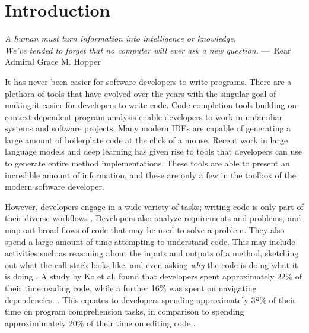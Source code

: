 
\newcommand{\numparticipants}{55}
\newcommand{\toolname}{Tool TBD}
\newcommand{\userstudynum}{75}
\newcommand{\fasterpct}{64}
\newcommand{\usefulpct}{70}

\chapter{Introduction}
\label{ch:Introduction}

\begin{epigraph}
    \emph{
       A human must turn information into intelligence or knowledge. \\
       We've tended to forget that no computer will ever ask a new question.
     } ---~Rear Admiral Grace M. Hopper
\end{epigraph}

\noindent It has never been easier for software developers to write programs.
There are a plethora of tools that have evolved over the years with the singular
goal of making it easier for developers to write code.
Code-completion tools building on context-dependent program analysis 
\cite{reps-1983-context} enable developers to work in unfamiliar systems and
software projects.
Many modern \acp{IDE} are capable of generating
a large amount of boilerplate code at the click of a mouse.
Recent work in large language models and deep learning \cite{chen-2021-copilot}
has given rise to tools that developers can use to generate entire method 
implementations.
These tools are able to present an incredible amount of information, and these 
are only a few in the toolbox of the modern software developer.

\par However, developers engage in a wide variety of tasks;
writing code is only part of their diverse workflows 
\cite{meyer-2017-work-life}.
Developers also analyze requirements and problems, and map out broad flows of
code that may be used to solve a problem.
They also spend a large amount of time attempting to understand code.
This may include activities such as reasoning about the inputs and outputs of
a method, sketching out what the call stack looks like, and even asking 
\emph{why} the code is doing what it is doing \cite{latoza-2006-mental-models}.
A study by Ko et al. found that developers spent approximately 22\% of their
time reading code, while a further 16\% was spent on navigating dependencies.
\cite{ko-2005-eliciting-design}.
This equates to developers spending approximately 38\% of their time on
program comprehension tasks, in comparison to spending approximimately 20\% of
their time on editing code \cite{ko-2005-eliciting-design}.

